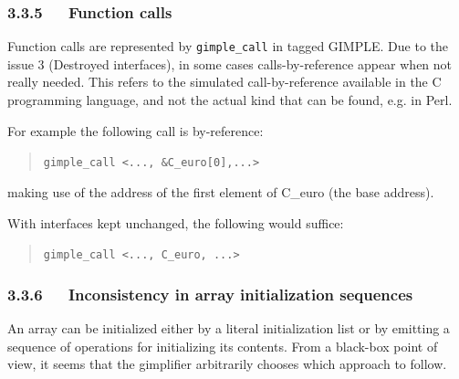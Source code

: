 \documentclass[a4paper]{article}
\begin{document}
\subsubsection{3.3.5~~~Function calls%
  \label{function-calls}%
}

Function calls are represented by \texttt{gimple\_call} in tagged GIMPLE. Due to
the issue 3 (Destroyed interfaces), in some cases calls-by-reference
appear when not really needed. This refers to the simulated call-by-reference
available in the C programming language, and not the actual kind that can
be found, e.g. in Perl.

For example the following call is by-reference:
%
\begin{quote}

\texttt{gimple\_call <..., \&C\_euro{[}0{]},...>}

\end{quote}

making use of the address of the first element of C\_euro (the base address).

With interfaces kept unchanged, the following would suffice:
%
\begin{quote}

\texttt{gimple\_call <..., C\_euro, ...>}

\end{quote}


\subsubsection{3.3.6~~~Inconsistency in array initialization sequences%
  \label{inconsistency-in-array-initialization-sequences}%
}

An array can be initialized either by a literal initialization list or
by emitting a sequence of operations for initializing its contents.
From a black-box point of view, it seems that the gimplifier arbitrarily
chooses which approach to follow.
\end{document}
